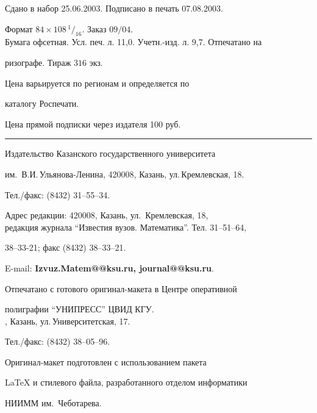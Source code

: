 \noindent Сдано в набор 25.06.2003. Подписано в печать 07.08.2003.


Формат $84\times 108 \,^1/_{16}.$ Заказ $09/04$.\\


Бумага офсетная. Усл. печ. л. 11,0. Учетн.-изд. л. 9,7. Отпечатано на 


ризографе. Тираж $316$ экз. 





\noindent Цена варьируется по регионам и определяется по 


каталогу Роспечати. 





\noindent Цена прямой подписки через издателя 100 руб. 


\bigskip


\hrule


\bigskip


\noindent Издательство Казанского государственного университета


им.~В.И.\,Ульянова-Ленина, 420008, Казань, ул.\,Кремлевская, 18.


Тел./факс: (8432) 31--55--34.\\


\smallskip





\noindent Адрес редакции: 420008, Казань, ул.~Кремлевская, 18,\\  


редакция журнала  ``Известия вузов. Математика''. Тел. 31--51--64,


38--33-21; факс (8432) 38--33--21.





\noindent E-mail: {\bf Izvuz.Matem@@ksu.ru, journal@@ksu.ru}. \par


\bigskip 


\noindent Отпечатано с готового оригинал-макета в Центре оперативной


полиграфии ``УНИПРЕСС'' ЦВИД КГУ. \\





, Казань, ул.\,Университетская, 17.


Тел./факс: (8432) 38--05--96. \par


\bigskip


\noindent Оригинал-макет подготовлен с использованием пакета


\AmS\LaTeX{} и стилевого файла, разработанного отделом информатики


НИИММ им.~Чеботарева.








